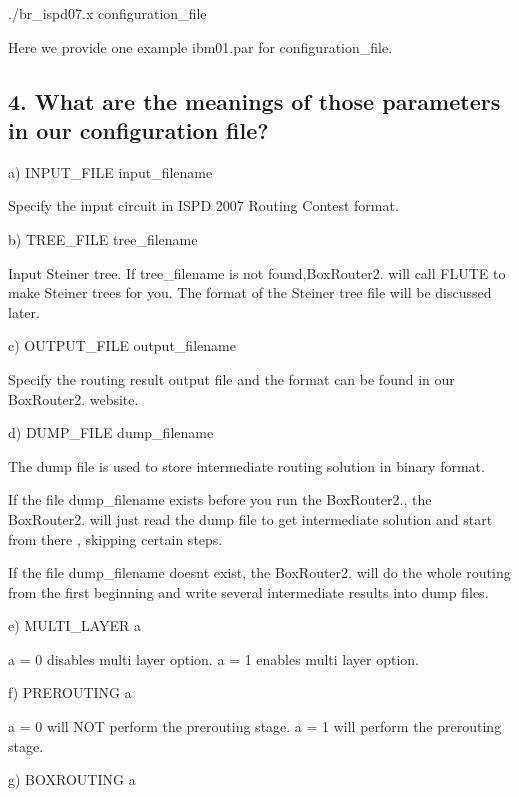 \begin{DoxyVerb}./br_ispd07.x configuration_file 
\end{DoxyVerb}


Here we provide one example ibm01.\+par for configuration\+\_\+file.

\subsection*{4. What are the meanings of those parameters in our configuration file?}


\begin{DoxyItemize}
\item a) I\+N\+P\+U\+T\+\_\+\+F\+I\+LE input\+\_\+filename

Specify the input circuit in I\+S\+PD 2007 Routing Contest format.
\item b) T\+R\+E\+E\+\_\+\+F\+I\+LE tree\+\_\+filename

Input Steiner tree. If tree\+\_\+filename is not found,Box\+Router2. will call F\+L\+U\+TE to make Steiner trees for you. The format of the Steiner tree file will be discussed later.
\item c) O\+U\+T\+P\+U\+T\+\_\+\+F\+I\+LE output\+\_\+filename

Specify the routing result output file and the format can be found in our Box\+Router2. website.
\item d) D\+U\+M\+P\+\_\+\+F\+I\+LE dump\+\_\+filename

The dump file is used to store intermediate routing solution in binary format.

If the file dump\+\_\+filename exists before you run the Box\+Router2., the Box\+Router2. will just read the dump file to get intermediate solution and start from there , skipping certain steps.

If the file dump\+\_\+filename doesn\textquotesingle{}t exist, the Box\+Router2. will do the whole routing from the first beginning and write several intermediate results into dump files.
\item e) M\+U\+L\+T\+I\+\_\+\+L\+A\+Y\+ER a

a = 0 disables multi layer option. a = 1 enables multi layer option.
\item f) P\+R\+E\+R\+O\+U\+T\+I\+NG a

a = 0 will N\+OT perform the prerouting stage. a = 1 will perform the prerouting stage.
\item g) B\+O\+X\+R\+O\+U\+T\+I\+NG a


\end{DoxyItemize}
